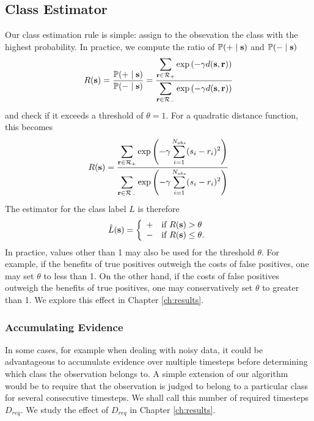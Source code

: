 \subsection{Class Estimator}
Our class estimation rule is simple: assign to the obsevation the class with the
highest probability. In practice, we compute the ratio of $\mathbb{P}(+ \;|\; \mathbf s)$
and $\mathbb{P}(- \;|\; \mathbf s)$ 
\begin{gather}
R(\mathbf s) = \frac{\mathbb{P}(+ \;|\; \mathbf s)}{\mathbb{P}(- \;|\; \mathbf s)} = \frac{\displaystyle \sum_{\mathbf r \in \mathcal{R}_+} \exp \left(-\gamma d(\mathbf s,\mathbf r)\right)}{\displaystyle \sum_{\mathbf r \in \mathcal{R}_-} \exp \left(-\gamma d(\mathbf s,\mathbf r)\right)}
\end{gather}
and check if it exceeds a threshold of $\theta = 1$. For a quadratic distance function, this becomes
\begin{gather}
R(\mathbf s) = \frac{\displaystyle \sum_{\mathbf r \in \mathcal{R}_+} \exp \left(-\gamma \displaystyle \sum_{i=1}^{N_{obs}} (s_i - r_i)^2\right)}{\displaystyle \sum_{\mathbf r \in \mathcal{R}_-} \exp \left(-\gamma \displaystyle \sum_{i=1}^{N_{obs}} (s_i - r_i)^2\right)}
\end{gather}
The estimator for the class label $L$ is therefore
\begin{gather}
\hat{L}(\mathbf s) = \left\{
\begin{array}{ll}
+ & \text{if } R(\mathbf s) > \theta\\
- & \text{if } R(\mathbf s) \leq \theta.
\end{array}
\right.
\end{gather}
In practice, values other than 1 may also be used for the threshold $\theta$. For
example, if the benefits of true positives outweigh the costs of false
positives, one may set $\theta$ to less than 1. On the other hand, if the
costs of false positives outweigh the benefits of true positives, one may
conservatively set $\theta$ to greater than 1. We explore this effect in
Chapter \ref{ch:results}.

\subsubsection{Accumulating Evidence}
In some cases, for example when dealing with noisy data, it could be
advantageous to accumulate evidence over multiple timesteps before determining
which class the observation belongs to. A simple extension of our algorithm
would be to require that the observation is judged to belong to a particular
class for several consecutive timesteps. We shall call this number of required
timesteps $D_{req}$. We study the effect of $D_{req}$ in Chapter \ref{ch:results}.

